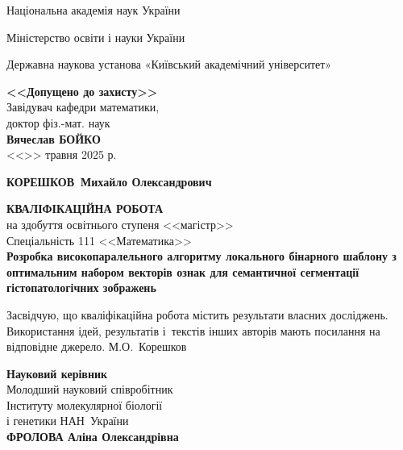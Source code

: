 \documentclass{thesis}
\newcommand{\MyFullName}{КОРЕШКОВ~Михайло Олександрович}
\newcommand{\MyReverseInitialName}{М.О.~Корешков}
\newcommand{\ThesisName}{Розробка високопаралельного алгоритму локального бінарного шаблону з оптимальним набором векторів ознак для семантичної сегментації гістопатологічних зображень}
\newcommand{\SuperviserFullName}{ФРОЛОВА Аліна Олександрівна}
\newcommand{\SuperviserAffiliation}{Молодший науковий співробітник\\Інституту молекулярної біології\\і генетики НАН~України}
\newcommand{\1}{\mathbb 1}
\begin{document}
\allowdisplaybreaks

\large

\setcounter{page}{1}
\thispagestyle{empty}
\centerline{Національна академія наук України}
\centerline{Міністерство освіти і науки України}
\centerline{Державна наукова установа «Київський академічний університет»}

\vspace{10mm}

\begin{flushright}
\begin{minipage}{100mm}
\begin{center}\large {\bf <<Допущено до захисту>>}\\
Завідувач кафедри математики,\\
доктор фіз.-мат. наук\\
{\bf Вячеслав БОЙКО}\\
<<\underline{\hspace{8mm}}>> травня 2025 р.
\end{center}
\end{minipage}
\end{flushright}

\vspace{10mm}

\centerline{\Large \bf \MyFullName}

\begin{center}
{\bf КВАЛІФІКАЦІЙНА РОБОТА}\\
на здобуття освітнього ступеня <<магістр>>\\
Спеціальність 111 <<Математика>>\\[4mm]
{\Large \bf \ThesisName}
\end{center}


\vspace{5mm}

\noindent
{Засвідчую, що кваліфікаційна робота містить результати власних досліджень. Використання ідей, результатів і~текстів інших авторів мають посилання на відповідне джерело.
\underline{\hspace{18mm}} \MyReverseInitialName \par}

\vspace{5mm}

\begin{flushright}
\begin{minipage}{90mm}
\large {\bf Науковий керівник}\\
\SuperviserAffiliation\\
{\bf \SuperviserFullName }\\
\underline{\hspace{48mm}}

\end{minipage}
\end{flushright}
\end{document}
